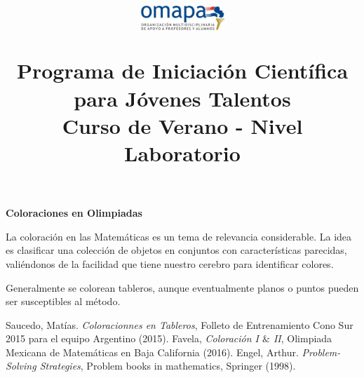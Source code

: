 \documentclass{article}
\title{
\begin{center}
	\includegraphics[width=120px, height=40px]{omapa.jpg}
	\vspace{1cm}
\end{center}
Programa de Iniciaci\'on Cient\'ifica para J\'ovenes Talentos \\ \Large Curso de Verano - Nivel Laboratorio
}
\date{}
\begin{document}
	\maketitle


	\begin{center}
		{\bfseries {\LARGE Coloraciones en Olimpiadas}}
	\end{center}
	
	La coloraci\'on en las Matem\'aticas es un tema de relevancia considerable. La idea es clasificar una colecci\'on de objetos en conjuntos con caracter\'isticas parecidas, vali\'endonos de la facilidad que tiene nuestro cerebro para identificar colores. 
	
	Generalmente se colorean tableros, aunque eventualmente planos o puntos pueden ser susceptibles al m\'etodo.
	
	
	
	
	
	\begin{thebibliography}{99}
	
	
	
	 Saucedo, Mat\'ias. \emph{Coloracionnes en Tableros}, Folleto de Entrenamiento Cono Sur 2015 para el equipo Argentino (2015).
	 Favela, \emph{Coloraci\'on I $\&$ II}, Olimpiada Mexicana de Matem\'aticas en Baja California (2016).
	 Engel, Arthur. \emph{Problem-Solving Strategies}, Problem books in mathematics, Springer (1998).
	
	\end{thebibliography}
	
\end{document}
